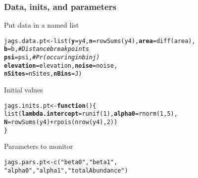 \documentclass[color=usenames,dvipsnames]{beamer}\usepackage[]{graphicx}\usepackage[]{color}
\makeatletter
\newcommand{\hlnum}[1]{\textcolor[rgb]{0.69,0.494,0}{#1}}%
\newcommand{\hlstr}[1]{\textcolor[rgb]{0.749,0.012,0.012}{#1}}%
\newcommand{\hlcom}[1]{\textcolor[rgb]{0.514,0.506,0.514}{\textit{#1}}}%
\newcommand{\hlopt}[1]{\textcolor[rgb]{0,0,0}{#1}}%
\newcommand{\hlstd}[1]{\textcolor[rgb]{0,0,0}{#1}}%
\newcommand{\hlkwa}[1]{\textcolor[rgb]{0,0,0}{\textbf{#1}}}%
\newcommand{\hlkwb}[1]{\textcolor[rgb]{0,0.341,0.682}{#1}}%
\newcommand{\hlkwc}[1]{\textcolor[rgb]{0,0,0}{\textbf{#1}}}%
\newcommand{\hlkwd}[1]{\textcolor[rgb]{0.004,0.004,0.506}{#1}}%
\newenvironment{kframe}{%
 \def\at@end@of@kframe{}%
 \ifinner\ifhmode%
  \def\at@end@of@kframe{\end{minipage}}%
  \begin{minipage}{\columnwidth}%
 \fi\fi%
 \def\FrameCommand##1{\hskip\@totalleftmargin \hskip-\fboxsep
 \colorbox{shadecolor}{##1}\hskip-\fboxsep
     \hskip-\linewidth \hskip-\@totalleftmargin \hskip\columnwidth}%
 \MakeFramed {\advance\hsize-\width
   \@totalleftmargin\z@ \linewidth\hsize
   \@setminipage}}%
 {\par\unskip\endMakeFramed%
 \at@end@of@kframe}
\newenvironment{knitrout}{}{} %
\makeatother
\begin{document}
\begin{frame}[fragile]
  \frametitle{Data, inits, and parameters}
  Put data in a named list
  \vspace{-12pt}
\begin{knitrout}\footnotesize
{}\color{fgcolor}\begin{kframe}
\begin{alltt}
\hlstd{jags.data.pt} \hlkwb{<-} \hlkwd{list}\hlstd{(}\hlkwc{y}\hlstd{=y4,} \hlkwc{n}\hlstd{=}\hlkwd{rowSums}\hlstd{(y4),} \hlkwc{area}\hlstd{=}\hlkwd{diff}\hlstd{(area),}
                     \hlkwc{b}\hlstd{=b,}           \hlcom{# Distance break points}
                     \hlkwc{psi}\hlstd{=psi,}       \hlcom{# Pr(occuring in bin j)}
                     \hlkwc{elevation}\hlstd{=elevation,} \hlkwc{noise}\hlstd{=noise,}
                     \hlkwc{nSites}\hlstd{=nSites,} \hlkwc{nBins}\hlstd{=J)}
\end{alltt}
\end{kframe}
\end{knitrout}
\pause
\vfill
  Initial values
  \vspace{-12pt}
\begin{knitrout}\footnotesize
{}\color{fgcolor}\begin{kframe}
\begin{alltt}
\hlstd{jags.inits.pt} \hlkwb{<-} \hlkwa{function}\hlstd{() \{}
    \hlkwd{list}\hlstd{(}\hlkwc{lambda.intercept}\hlstd{=}\hlkwd{runif}\hlstd{(}\hlnum{1}\hlstd{),} \hlkwc{alpha0}\hlstd{=}\hlkwd{rnorm}\hlstd{(}\hlnum{1}\hlstd{,} \hlnum{5}\hlstd{),}
         \hlkwc{N}\hlstd{=}\hlkwd{rowSums}\hlstd{(y4)}\hlopt{+}\hlkwd{rpois}\hlstd{(}\hlkwd{nrow}\hlstd{(y4),} \hlnum{2}\hlstd{))}
\hlstd{\}}
\end{alltt}
\end{kframe}
\end{knitrout}
\pause
\vfill
  Parameters to monitor
  \vspace{-12pt}
\begin{knitrout}\small
{}\color{fgcolor}\begin{kframe}
\begin{alltt}
\hlstd{jags.pars.pt} \hlkwb{<-} \hlkwd{c}\hlstd{(}\hlstr{"beta0"}\hlstd{,} \hlstr{"beta1"}\hlstd{,}
                  \hlstr{"alpha0"}\hlstd{,} \hlstr{"alpha1"}\hlstd{,} \hlstr{"totalAbundance"}\hlstd{)}
\end{alltt}
\end{kframe}
\end{knitrout}
\end{frame}
\end{document}
